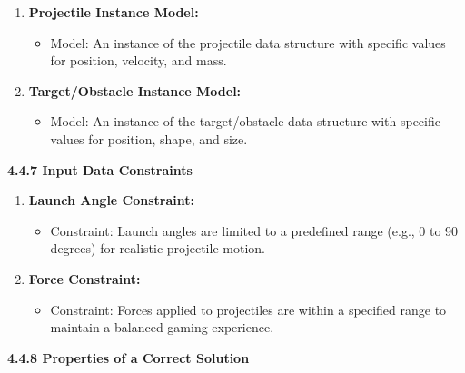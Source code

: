 \documentclass[
]{article}
\begin{document}
\begin{enumerate}
\def\labelenumi{\arabic{enumi}.}
\item
  \textbf{Projectile Instance Model:}

  \begin{itemize}
  \item
    Model: An instance of the projectile data structure with specific
    values for position, velocity, and mass.
  \end{itemize}
\item
  \textbf{Target/Obstacle Instance Model:}

  \begin{itemize}
  \item
    Model: An instance of the target/obstacle data structure with
    specific values for position, shape, and size.
  \end{itemize}
\end{enumerate}

\textbf{4.4.7 Input Data Constraints}

\begin{enumerate}
\def\labelenumi{\arabic{enumi}.}
\item
  \textbf{Launch Angle Constraint:}

  \begin{itemize}
  \item
    Constraint: Launch angles are limited to a predefined range (e.g., 0
    to 90 degrees) for realistic projectile motion.
  \end{itemize}
\item
  \textbf{Force Constraint:}

  \begin{itemize}
  \item
    Constraint: Forces applied to projectiles are within a specified
    range to maintain a balanced gaming experience.
  \end{itemize}
\end{enumerate}

\textbf{4.4.8 Properties of a Correct Solution}
\end{document}
